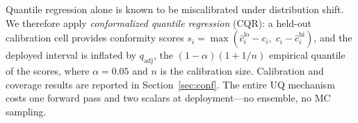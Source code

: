 Quantile regression alone is known to be miscalibrated under
distribution shift. We therefore apply \emph{conformalized quantile
regression} (CQR): a held-out calibration cell provides conformity
scores $s_i = \max(\hat{c}_i^{\text{lo}} - c_i,\; c_i -
\hat{c}_i^{\text{hi}})$, and the deployed interval is inflated by
$q_{\text{adj}}$, the $(1-\alpha)(1+1/n)$ empirical quantile of the
scores, where $\alpha = 0.05$ and $n$ is the calibration size.
Calibration and coverage results are reported in
Section~\ref{sec:conf}. The entire UQ mechanism costs one forward
pass and two scalars at deployment---no ensemble, no MC sampling.

